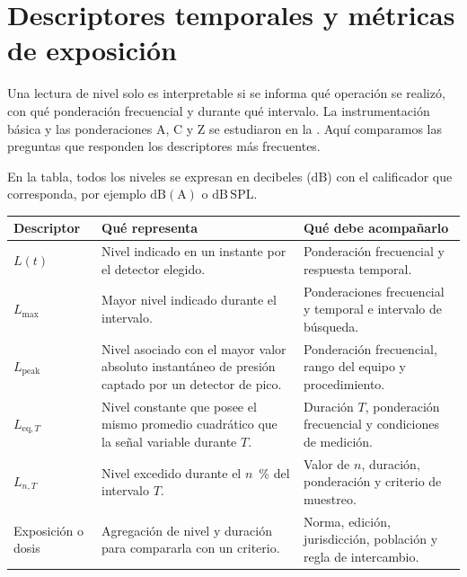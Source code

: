 \section{Descriptores temporales y métricas de exposición}
\label{sec:u10-metricas}

Una lectura de nivel solo es interpretable si se informa qué operación se
realizó, con qué ponderación frecuencial y durante qué intervalo. La
instrumentación básica y las ponderaciones A, C y Z se estudiaron en la
. Aquí comparamos las preguntas que responden los
descriptores más frecuentes.

En la tabla, todos los niveles se expresan en decibeles (\(\mathrm{dB}\)) con
el calificador que corresponda, por ejemplo \(\mathrm{dB(A)}\) o
\(\mathrm{dB\,SPL}\).

\begin{center}
\small
\begin{tabular}{|
    >{\raggedright\arraybackslash}p{}|
    >{\raggedright\arraybackslash}p{}|
    >{\raggedright\arraybackslash}p{}|}
    \hline
    \textbf{Descriptor} & \textbf{Qué representa} &
    \textbf{Qué debe acompañarlo} \\
    \hline
    \(L(t)\) & Nivel indicado en un instante por el detector elegido. &
    Ponderación frecuencial y respuesta temporal. \\
    \hline
    \(L_{\mathrm{max}}\) & Mayor nivel indicado durante el intervalo. &
    Ponderaciones frecuencial y temporal e intervalo de búsqueda. \\
    \hline
    \(L_{\mathrm{peak}}\) & Nivel asociado con el mayor valor absoluto
    instantáneo de presión captado por un detector de pico. &
    Ponderación frecuencial, rango del equipo y procedimiento. \\
    \hline
    \(L_{\mathrm{eq},T}\) & Nivel constante que posee el mismo promedio
    cuadrático que la señal variable durante \(T\). &
    Duración \(T\), ponderación frecuencial y condiciones de medición. \\
    \hline
    \(L_{n,T}\) & Nivel excedido durante el \(n\)~\% del intervalo \(T\). &
    Valor de \(n\), duración, ponderación y criterio de muestreo. \\
    \hline
    Exposición o dosis & Agregación de nivel y duración para compararla con
    un criterio. & Norma, edición, jurisdicción, población y regla de
    intercambio. \\
    \hline
\end{tabular}
\end{center}

